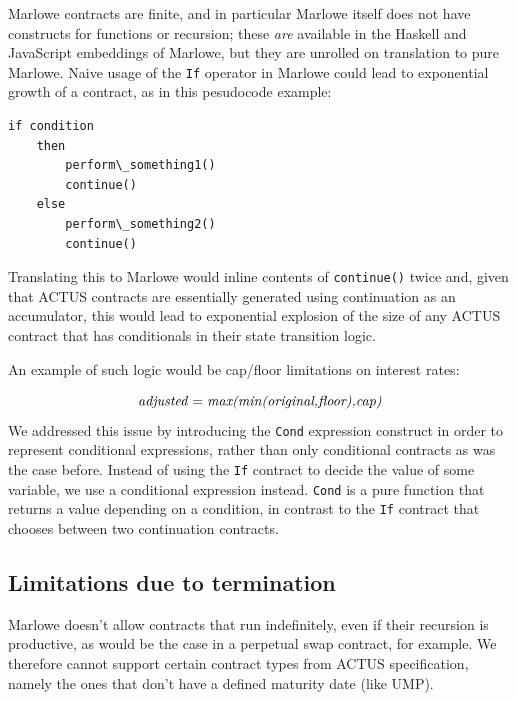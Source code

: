 \documentclass[runningheads]{llncs}
\newcommand{\ident}[1]{\mbox{\emph{#1}}}
\begin{document}
Marlowe contracts are finite, and in particular Marlowe itself does not have constructs for functions or recursion; these \emph{are} available in the Haskell and JavaScript embeddings of Marlowe, but they are unrolled on translation to pure Marlowe. Naive usage of the \texttt{If} operator in Marlowe could lead to exponential growth of a contract, as in this pesudocode example:

\begin{verbatim}
if condition 
	then 
		perform\_something1()
		continue() 
	else 
		perform\_something2() 
		continue()
\end{verbatim}
\noindent
Translating this to Marlowe would inline contents of \texttt{continue()} twice and, given that ACTUS
contracts are essentially generated using continuation as an accumulator,
this would lead to exponential explosion of the size of any ACTUS
contract that has conditionals in their state transition logic.

An example of such logic would be cap/floor limitations on interest rates:

\noindent 
\begin{equation}
\ident{adjusted}=\ident{max(min(original,floor),cap)}
\end{equation}
\noindent
We addressed this issue by introducing the \texttt{Cond} expression construct in order
to represent conditional expressions, rather than only conditional contracts as was the case before. Instead of using the \texttt{If}
contract to decide the value of some variable, we use a conditional expression instead.  
\texttt{Cond} is  a pure function
that returns a value depending on a condition, in contrast to the \texttt{If}
contract that chooses between two continuation contracts. 

\subsection{Limitations due to termination}

Marlowe doesn't allow contracts that run indefinitely, even if their recursion
is productive, as would be the case in a perpetual swap contract, for example. We therefore cannot support certain
contract types from ACTUS specification, namely the ones that don't
have a defined maturity date (like UMP). 
\end{document}

